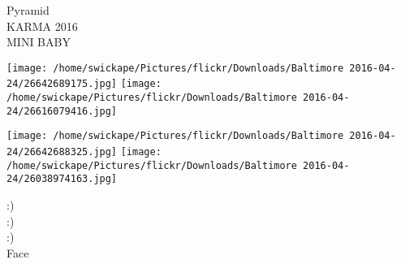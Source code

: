 \documentclass[10pt,letterpaper]{article}
\begin{document}
Pyramid\\
KARMA 2016\\
MINI BABY
\pagebreak

\texttt{[image: /home/swickape/Pictures/flickr/Downloads/Baltimore 2016-04-24/26642689175.jpg]}
\texttt{[image: /home/swickape/Pictures/flickr/Downloads/Baltimore 2016-04-24/26616079416.jpg]}

\texttt{[image: /home/swickape/Pictures/flickr/Downloads/Baltimore 2016-04-24/26642688325.jpg]}
\texttt{[image: /home/swickape/Pictures/flickr/Downloads/Baltimore 2016-04-24/26038974163.jpg]}

:)\\
:)\\
:)\\
Face
\pagebreak
\end{document}
